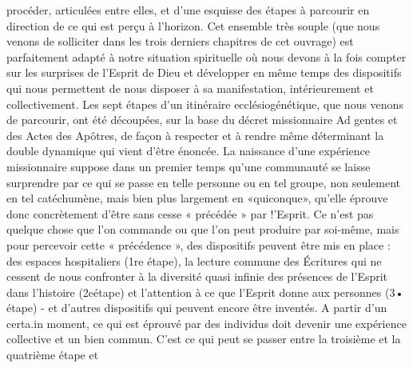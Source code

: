{ 
procéder, articulées entre elles, et d'une esquisse des étapes à parcourir en direction de ce qui est perçu à l'horizon. Cet ensemble très souple (que nous venons de solliciter dans les trois derniers chapitres de cet ouvrage) est parfaitement adapté à notre situation spirituelle où nous devons à la fois compter sur les surprises de l'Esprit de Dieu et développer en même temps des dispositifs qui nous permettent de nous disposer à sa manifestation, intérieurement et collectivement.
Les sept étapes d'un itinéraire ecclésiogénétique, que nous venons de parcourir, ont été découpées, sur la base du décret missionnaire Ad gentes et des Actes des Apôtres, de façon à respecter et à rendre même déterminant la double dynamique qui vient d'être énoncée. La naissance d'une expérience missionnaire suppose dans un premier temps qu'une communauté se laisse surprendre par ce qui se passe en telle personne ou en tel groupe, non seulement en tel catéchumène, mais bien plus largement en «quiconque», qu'elle éprouve donc concrètement d'être sans cesse « précédée » par !'Esprit. Ce n'est pas quelque chose que l'on commande ou que l'on peut produire par soi-même, mais pour percevoir cette « précédence », des dispositifs peuvent être mis en place : des espaces hospitaliers (1re étape), la lecture commune des Écritures qui ne cessent de nous confronter à la diversité quasi infinie des présences de l'Esprit dans l'histoire (2eétape) et l'attention à ce que l'Esprit donne aux personnes (3• étape) - et d'autres dispositifs qui peuvent encore être inventés. A partir d'un certa.in moment, ce qui est éprouvé par des individus doit devenir une expérience collective et un bien commun. C'est ce qui peut se passer entre la troisième et la quatrième étape et
 
}
